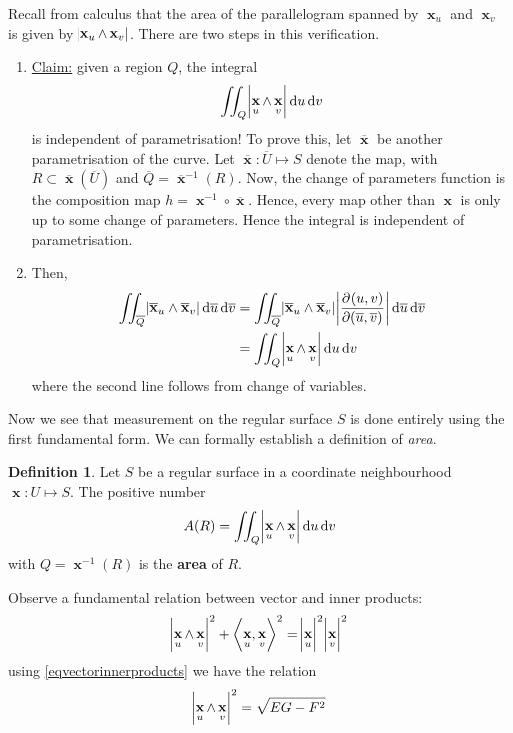 \documentclass{amsart} %
\theoremstyle{mytheoremstyle}
\theoremstyle{definition}
\newtheorem{definition}{Definition}[section]
\numberwithin{equation}{section}
\DeclareMathOperator{\1}{\mathbbm{1}}
\DeclareMathOperator{\D}{\dif}
\DeclareMathOperator{\x}{\mathbf{x}}
\newcommand{\innerproduct}[2]{\left\langle #1,#2 \right\rangle}
\begin{document}
Recall from calculus that the area of the parallelogram spanned by $\x_u$ and $\x_v$ is given by $\abs{\x_u \wedge \x_v}$. There are two steps in this verification.
\begin{enumerate}
	\item \uline{Claim:} given a region $Q$, the integral
	\begin{align*}
		\iint_Q \abs{\x_u \wedge \x_v} \D u \D v
	\end{align*}
	is independent of parametrisation! To prove this, let $\overline{\x}$ be another parametrisation of the curve. Let $\overline{\x} : \overline{U} \mapsto S$ denote the map, with $R \subset \overline{\x} (\overline{U})$ and $\overline{Q} = \overline{\x}^{-1} (R)$. Now, the change of parameters function is the composition map $h = \x^{-1} \circ \overline{\x}$. Hence, every map other than $\x$ is only up to some change of parameters. Hence the integral is independent of parametrisation.
	
	\item Then,
	\begin{align*}
		\iint_{\overline{Q}} \abs{\overline{\x}_u \wedge \overline{\x}_v} \D \overline{u} \D \overline{v} &= \iint_{\overline{Q}} \abs{\overline{\x}_u \wedge \overline{\x}_v} \abs{\dpd{(u,v)}{(\overline{u},\overline{v})}} \D \overline{u} \D \overline{v}  \\
		&= \iint_Q \abs{\x_u \wedge \x_v} \D u \D v
	\end{align*}
	where the second line follows from change of variables.
\end{enumerate}

Now we see that measurement on the regular surface $S$ is done entirely using the first fundamental form. We can formally establish a definition of \textit{area}.

\begin{definition}
	\label{defarea}
	Let $S$ be a regular surface in a coordinate neighbourhood $\x: U \mapsto S$. The positive number 
	\begin{align}
	\label{eqarea}
	A(R) = \iint_{Q} \abs{\x_u \wedge \x_v} \D u \D v 
	\end{align}
	with $Q = \x^{-1} (R)$ is the \textbf{area} of $R$.
\end{definition}

Observe a fundamental relation between vector and inner products: 
\begin{align}
	\label{eqvectorinnerproducts}
	\abs{\x_u \wedge \x_v}^2+ \innerproduct{\x_u}{\x_v}^2 = \abs{\x_u}^2 \abs{\x_v}^2
\end{align}
using \eqref{eqvectorinnerproducts} we have the relation
\begin{align}
	\label{eqareaparallelogramusingfirstfundamentalform}
	\abs{\x_u \wedge \x_v}^2 = \sqrt{EG - F^2}
\end{align}
\end{document}
